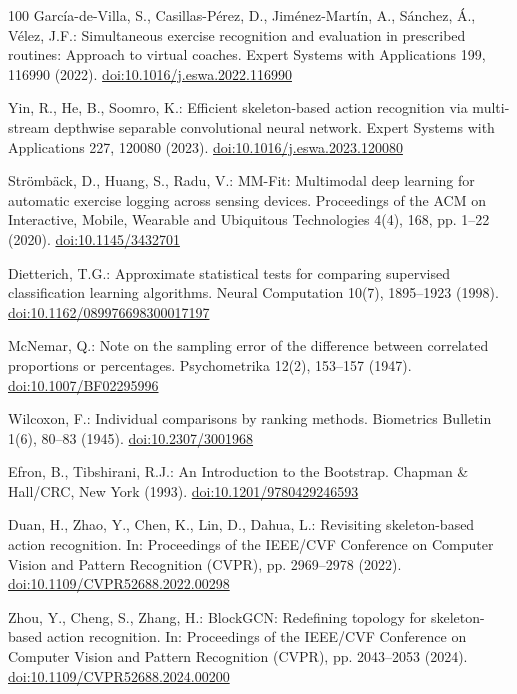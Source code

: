 \documentclass[runningheads]{llncs}
\begin{document}
\begin{thebibliography}{100}
Garc\'{i}a-de-Villa, S., Casillas-P\'{e}rez, D., Jim\'{e}nez-Mart\'{i}n, A., S\'{a}nchez, \'{A}., V\'{e}lez, J.F.: Simultaneous exercise recognition and evaluation in prescribed routines: Approach to virtual coaches. Expert Systems with Applications 199, 116990 (2022). \href{https://doi.org/10.1016/j.eswa.2022.116990}{doi:10.1016/j.eswa.2022.116990}

Yin, R., He, B., Soomro, K.: Efficient skeleton-based action recognition via multi-stream depthwise separable convolutional neural network. Expert Systems with Applications 227, 120080 (2023). \href{https://doi.org/10.1016/j.eswa.2023.120080}{doi:10.1016/j.eswa.2023.120080}

Str\"{o}mb\"{a}ck, D., Huang, S., Radu, V.: MM-Fit: Multimodal deep learning for automatic exercise logging across sensing devices. Proceedings of the ACM on Interactive, Mobile, Wearable and Ubiquitous Technologies 4(4), 168, pp. 1--22 (2020). \href{https://doi.org/10.1145/3432701}{doi:10.1145/3432701}

Dietterich, T.G.: Approximate statistical tests for comparing supervised classification learning algorithms. Neural Computation 10(7), 1895--1923 (1998). \href{https://doi.org/10.1162/089976698300017197}{doi:10.1162/089976698300017197}

McNemar, Q.: Note on the sampling error of the difference between correlated proportions or percentages. Psychometrika 12(2), 153--157 (1947). \href{https://doi.org/10.1007/BF02295996}{doi:10.1007/BF02295996}

Wilcoxon, F.: Individual comparisons by ranking methods. Biometrics Bulletin 1(6), 80--83 (1945). \href{https://doi.org/10.2307/3001968}{doi:10.2307/3001968}

Efron, B., Tibshirani, R.J.: An Introduction to the Bootstrap. Chapman \& Hall/CRC, New York (1993). \href{https://doi.org/10.1201/9780429246593}{doi:10.1201/9780429246593}

Duan, H., Zhao, Y., Chen, K., Lin, D., Dahua, L.: Revisiting skeleton-based action recognition. In: Proceedings of the IEEE/CVF Conference on Computer Vision and Pattern Recognition (CVPR), pp. 2969--2978 (2022). \href{https://doi.org/10.1109/CVPR52688.2022.00298}{doi:10.1109/CVPR52688.2022.00298}

Zhou, Y., Cheng, S., Zhang, H.: BlockGCN: Redefining topology for skeleton-based action recognition. In: Proceedings of the IEEE/CVF Conference on Computer Vision and Pattern Recognition (CVPR), pp. 2043--2053 (2024). \href{https://doi.org/10.1109/CVPR52688.2024.00200}{doi:10.1109/CVPR52688.2024.00200}

\end{thebibliography}
\end{document}
